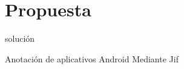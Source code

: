 \section{Propuesta}
	
\begin{frame}{solución}
	\begin{block}{}
	Anotación de aplicativos Android Mediante Jif
	\end{block}
\end{frame}